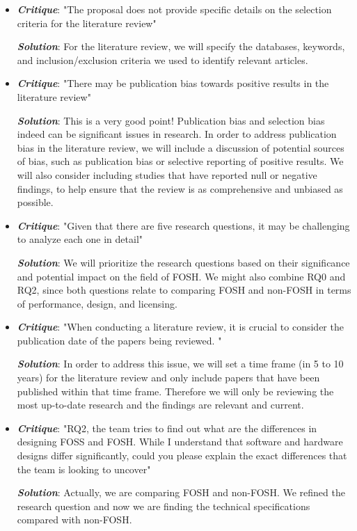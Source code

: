 \documentclass[acmtog]{acmart}
\begin{document}
\begin{itemize}
\item {\textbf{\itshape Critique}}: "The proposal does not provide specific details on the selection criteria for the literature review" 
\par{\textbf{\itshape Solution}}: For the literature review, we will specify the databases, keywords, and inclusion/exclusion criteria we used to identify relevant articles.
\item {\textbf{\itshape Critique}}: "There may be publication bias towards positive results in the literature review" 
\par{\textbf{\itshape Solution}}: This is a very good point! Publication bias and selection bias indeed can be significant issues in research. In order to address publication bias in the literature review, we will include a discussion of potential sources of bias, such as publication bias or selective reporting of positive results. We will also consider including studies that have reported null or negative findings, to help ensure that the review is as comprehensive and unbiased as possible.
\item {\textbf{\itshape Critique}}: "Given that there are five research questions, it may be challenging to analyze each one in detail" 
\par{\textbf{\itshape Solution}}: We will prioritize the research questions based on their significance and potential impact on the field of FOSH. We might also combine RQ0 and RQ2, since both questions relate to comparing FOSH and non-FOSH in terms of performance, design, and licensing.
\item {\textbf{\itshape Critique}}: "When conducting a literature review, it is crucial to consider the publication date of the papers being reviewed.  " 
\par{\textbf{\itshape Solution}}:  In order to address this issue, we will set a time frame (in 5 to 10 years) for the literature review and only include papers that have been published within that time frame. Therefore we will only be reviewing the most up-to-date research and the findings are relevant and current. 
\item {\textbf{\itshape Critique}}: "RQ2, the team tries to find out what are the differences in designing FOSS and FOSH. While I understand that software and hardware designs differ significantly, could you please explain the exact differences that the team is looking to uncover" 
\par{\textbf{\itshape Solution}}: Actually, we are comparing FOSH and non-FOSH. We refined the research question and now we are finding the technical specifications compared with non-FOSH.

\end{itemize}
\end{document}
